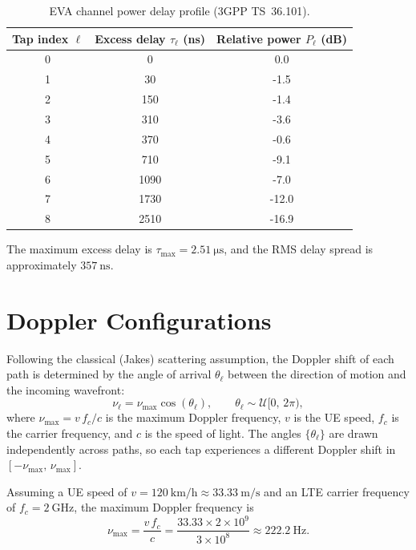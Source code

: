 \documentclass[11pt]{article}
\begin{document}
\begin{table}[h]
    \centering
    \caption{EVA channel power delay profile (3GPP TS~36.101).}
    \label{tab:eva}
    \begin{tabular}{c S[table-format=4.0] S[table-format=-2.1]}
        \toprule
        Tap index $\ell$ & {Excess delay $\tau_\ell$ (ns)} & {Relative power $P_\ell$ (dB)} \\
         &    0 &   0.0 \\
        1 &   30 &  -1.5 \\
        2 &  150 &  -1.4 \\
        3 &  310 &  -3.6 \\
        4 &  370 &  -0.6 \\
        5 &  710 &  -9.1 \\
        6 & 1090 &  -7.0 \\
        7 & 1730 & -12.0 \\
        8 & 2510 & -16.9 \\
        \bottomrule
    \end{tabular}
\end{table}

The maximum excess delay is $\tau_{\max} = \SI{2.51}{\micro\second}$, and the
RMS delay spread is approximately $\SI{357}{\nano\second}$.

\section{Doppler Configurations}
Following the classical (Jakes) scattering assumption, the Doppler shift of
each path is determined by the angle of arrival $\theta_\ell$ between the
direction of motion and the incoming wavefront:
\begin{equation}
    \nu_\ell = \nu_{\max}\cos(\theta_\ell),
    \qquad \theta_\ell \sim \mathcal{U}[0,\,2\pi),
\end{equation}
where $\nu_{\max} = v\,f_c / c$ is the maximum Doppler frequency, $v$ is the
UE speed, $f_c$ is the carrier frequency, and $c$ is the speed of light.
The angles $\{\theta_\ell\}$ are drawn independently across paths, so each
tap experiences a different Doppler shift in $[-\nu_{\max},\,\nu_{\max}]$.

Assuming a UE speed of $v = \SI{120}{\kilo\meter\per\hour} \approx
\SI{33.33}{\meter\per\second}$ and an LTE carrier frequency of
$f_c = \SI{2}{\giga\hertz}$, the maximum Doppler frequency is
\begin{equation}
    \nu_{\max}
    = \frac{v\,f_c}{c}
    = \frac{33.33 \times 2 \times 10^{9}}{3 \times 10^{8}}
    \approx \SI{222.2}{\hertz}.
\end{equation}
\end{document}
